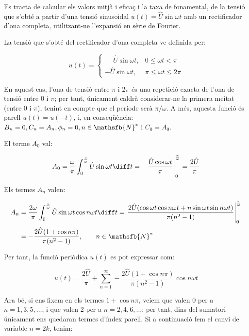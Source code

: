 	
\begin{exemple}[\ValorMitjaEfTaxaFon{}]
	\addcontentsxms{\ValorMitjaEfTaxaFon}
    Es tracta de calcular els valors mitjà i eficaç i la taxa de
    fonamental, de la tensió que s'obté a partir d'una tensió
    sinusoidal $u(t) = \hat{U} \sin\omega t$ amb un rectificador d'ona
    completa, utilitzant-ne l'expansió en sèrie de Fourier.

    La tensió que s'obté del rectificador d'ona completa ve definida
    per:

    \[
    u(t) = \begin{cases} \phantom{-}\hat{U} \sin\omega t, & 0 \leq \omega t < \pi\\
           -\hat{U} \sin\omega t, & \pi \leq \omega t \leq 2\pi \end{cases}
    \]

    En aquest cas, l'ona de tensió entre $\pi$ i $2\pi$ és una repetició
    exacta de l'ona de tensió entre 0 i $\pi$; per tant, únicament
    caldrà considerar-ne la primera meitat (entre 0 i $\pi$), tenint en
    compte que el període serà $\pi/\omega$. A més, aquesta funció és
    parell $u(t) = u(-t)$, i, en conseqüència:
    $B_n = 0, C_n = A_n, \phi_n = 0, n \in \mathsfb{N}^*$ i $C_0 = A_0$.

    El terme $A_0$ val:

    \[
    A_0 = \frac{\omega}{\pi} \int_0^{\frac{\pi}{\omega}} \hat{U} \sin
    \omega t \diff t = \left. -\frac{\hat{U} \cos \omega t}{\pi}
    \right|_0^{\frac{\pi}{\omega}} = \frac{2\hat{U}}{\pi}
    \]

    Els termes $A_n$ valen:

    \[
    \begin{split}
    A_n &= \frac{2 \omega}{\pi} \int_0^{\frac{\pi}{\omega}} \hat{U} \sin
    \omega t \cos n \omega t \diff t = \left. \frac{2 \hat{U}( \cos
    \omega t \cos  n \omega t + n \sin \omega t \sin n \omega
    t)}{\pi(n^2-1)} \right|_0^{\frac{\pi}{\omega}}\\[0.5ex]
    &= -\frac{2\hat{U}(1+\cos n \pi)}{\pi(n^2-1)},
    \qquad n \in \mathsfb{N}^*
    \end{split}
    \]

    Per tant, la funció periòdica $u(t)$ es pot expressar com:

    \[
        u(t) = \frac{2\hat{U}}{\pi} + \sum_{n=1}^\infty
         - \frac{2\hat{U}(1+\cos n \pi)}{\pi(n^2-1)} \cos n \omega t
    \]

    Ara bé, si ens fixem en els termes $1+\cos n \pi$, veiem que valen 0
    per a $n=1,3,5,\ldots$, i que valen 2 per a $n=2,4,6,\ldots$; per tant, dins
    del sumatori únicament ens quedaran termes d'índex parell. Si a
    continuació fem el canvi de variable $n=2k$, tenim:


\end{exemple}

